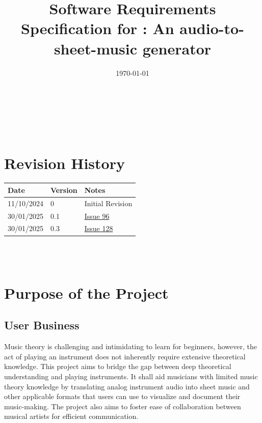 \documentclass[12pt]{article}
\begin{document}
\title{Software Requirements Specification for \progname: An audio-to-sheet-music generator} 
\author{\authname}
\date{\today}
	
\maketitle
\thispagestyle{empty}

~\newpage


\tableofcontents

~\newpage

\section*{Revision History}

\begin{tabularx}{\textwidth}{p{3cm}p{2cm}X}
\toprule {\textbf{Date}} & {\textbf{Version}} & {\textbf{Notes}}\\
\midrule
11/10/2024 & 0 & Initial Revision\\
30/01/2025 & 0.1 & \href{https://github.com/emilyperica/ScoreGen/issues/96}{Issue 96}\\
30/01/2025 & 0.3 & \href{https://github.com/emilyperica/ScoreGen/issues/128}{Issue 128}\\
\bottomrule
\end{tabularx}

~\\

~\newpage

\section{Purpose of the Project}
\subsection{User Business}
Music theory is challenging and intimidating to learn for beginners, 
however, the act of playing an instrument does not inherently require 
extensive theoretical knowledge. This project aims to bridge the gap 
between deep theoretical understanding and playing instruments. It 
shall aid musicians with limited music theory knowledge by translating 
analog instrument audio into sheet music and other applicable formats 
that users can use to visualize and document their music-making. The 
project also aims to foster ease of collaboration between musical 
artists for efficient communication. 
\end{document}
